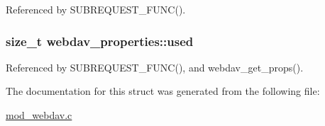 Referenced by S\-U\-B\-R\-E\-Q\-U\-E\-S\-T\-\_\-\-F\-U\-N\-C().

\hypertarget{structwebdav__properties_ad6a8788a6be3d4755ab36451e845209b}{
\subsubsection[{used}]{\setlength{\rightskip}{0pt plus 5cm}size\-\_\-t webdav\-\_\-properties\-::used}}\label{structwebdav__properties_ad6a8788a6be3d4755ab36451e845209b}


Referenced by S\-U\-B\-R\-E\-Q\-U\-E\-S\-T\-\_\-\-F\-U\-N\-C(), and webdav\-\_\-get\-\_\-props().



The documentation for this struct was generated from the following file\-:\begin{DoxyCompactItemize}
\item 
\hyperlink{mod__webdav_8c}{mod\-\_\-webdav.\-c}\end{DoxyCompactItemize}

